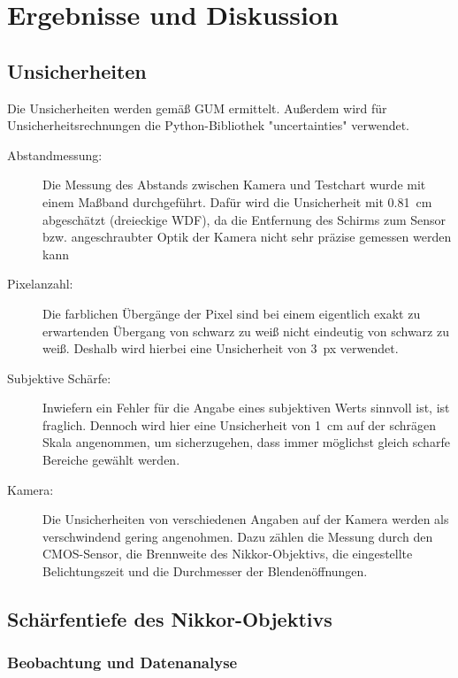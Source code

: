 \documentclass[
	a4paper,
	12pt,
	pagesize,
	ngerman
]{scrartcl}
\begin{document}
	\section{Ergebnisse und Diskussion}
	
	\subsection{Unsicherheiten} %
Die Unsicherheiten werden gemäß GUM ermittelt. 
	Außerdem wird für Unsicherheitsrechnungen die Python-Bibliothek "uncertainties" verwendet.
	\begin{description}
		\item[Abstandmessung:] Die Messung des Abstands zwischen Kamera und Testchart wurde mit einem Maßband durchgeführt. 
			Dafür wird die Unsicherheit mit \SI{0,81}{cm} abgeschätzt (dreieckige WDF), da die Entfernung des Schirms zum Sensor bzw. angeschraubter Optik der Kamera nicht sehr präzise gemessen werden kann
		\item[Pixelanzahl:] Die farblichen Übergänge der Pixel sind bei einem eigentlich exakt zu erwartenden Übergang von schwarz zu weiß nicht eindeutig von schwarz zu weiß. %
			Deshalb wird hierbei eine Unsicherheit von \SI{3}{px} verwendet.
		\item[Subjektive Schärfe:] Inwiefern ein Fehler für die Angabe eines subjektiven Werts sinnvoll ist, ist fraglich. %
			Dennoch wird hier eine Unsicherheit von \SI{1}{cm} auf der schrägen Skala angenommen, um sicherzugehen, dass immer möglichst gleich scharfe Bereiche gewählt werden. 
		\item[Kamera:] Die Unsicherheiten von verschiedenen Angaben auf der Kamera werden als verschwindend gering angenohmen.
			Dazu zählen die Messung durch den CMOS-Sensor, die Brennweite des Nikkor-Objektivs, die eingestellte Belichtungszeit und die Durchmesser der Blendenöffnungen. %
	\end{description} 

	\subsection{Schärfentiefe des Nikkor-Objektivs}
	\subsubsection{Beobachtung und Datenanalyse}
\end{document}
